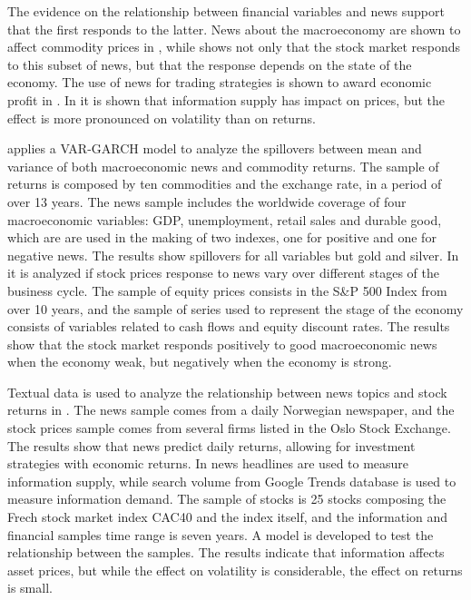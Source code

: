 \documentclass[cic,tc, english]{iiufrgs}
\begin{document}
    The evidence on the relationship between financial variables and news support that the first responds to the latter. News about the macroeconomy are shown to affect commodity prices in \citet{caporaleetal2015}, while \citet{macqueenroley1993} shows not only that the stock market responds to this subset of news, but that the response depends on the state of the economy. The use of news for trading strategies is shown to award economic profit in \citet{larsenthorsrud2017}. In \citet{moussaetal2017} it is shown that information supply has impact on prices, but the effect is more pronounced on volatility than on returns.

    \citet{caporaleetal2015} applies a VAR-GARCH model to analyze the spillovers between mean and variance of both macroeconomic news and commodity returns. The sample of returns is composed by ten commodities and the exchange rate, in a period of over 13 years. The news sample includes the worldwide coverage of four macroeconomic variables: GDP, unemployment, retail sales and durable good, which are are used in the making of two indexes, one for positive and one for negative news. The results show spillovers for all variables but gold and silver.
    In \citet{macqueenroley1993} it is analyzed if stock prices response to news vary over different stages of the business cycle. The sample of equity prices consists in the S\&P 500 Index from over 10 years, and the sample of series used to represent the stage of the economy consists of variables related to cash flows and equity discount rates. The results show that the stock market responds positively to good macroeconomic news when the economy weak, but negatively when the economy is strong.

    Textual data is used to analyze the relationship between news topics and stock returns in \citet{larsenthorsrud2017}. The news sample comes from a daily Norwegian newspaper, and the stock prices sample comes from several firms listed in the Oslo Stock Exchange. The results show that news predict daily returns, allowing for investment strategies with economic returns.
    In \citet{moussaetal2017} news headlines are used to measure information supply, while search volume from Google Trends database is used to measure information demand. The sample of stocks is 25 stocks composing the Frech stock market index CAC40 and the index itself, and the information and financial samples time range is seven years. A model is developed to test the relationship between the samples. The results indicate that information affects asset prices, but while the effect on volatility is considerable, the effect on returns is small.
\end{document}
